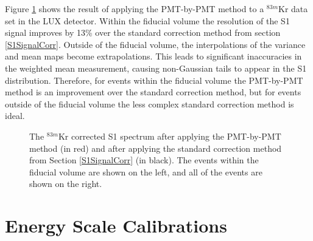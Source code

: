 \documentclass[a4paper,12pt]{article}
\begin{document}
{Figure \ref{PMTxPMTResult} shows the result of applying the PMT-by-PMT method to a $^{83m}$Kr data set in the LUX detector.  Within the fiducial volume the resolution of the S1 signal improves by 13\% over the standard correction method from section \ref{S1SignalCorr}.  Outside of the fiducial volume, the interpolations of the variance and mean maps become extrapolations.  This leads to significant inaccuracies in the weighted mean measurement, causing non-Gaussian tails to appear in the S1 distribution.  Therefore, for events within the fiducial volume the PMT-by-PMT method is an improvement over the standard correction method, but for events outside of the fiducial volume the less complex standard correction method is ideal.


\begin{figure} [h!]
\centering
{}
\qquad
{}
\caption{ The $^{83m}$Kr corrected S1 spectrum after applying the PMT-by-PMT method (in red) and after applying the standard correction method from Section \ref{S1SignalCorr} (in black).  The events within the fiducial volume are shown on the left, and all of the events are shown on the right.}
\label{PMTxPMTResult}
\end{figure}


\section{Energy Scale Calibrations} \label{CombinedEnergyModel}

}
\end{document}
